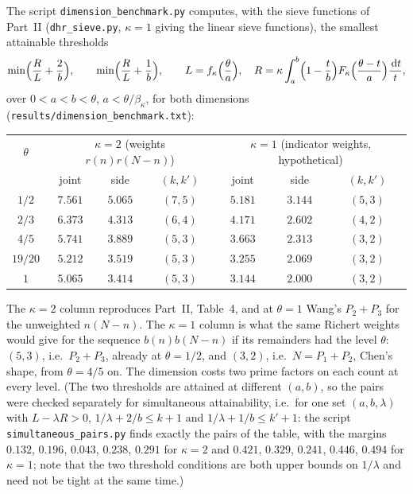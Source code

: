 \documentclass[11pt,a4paper]{article}
\theoremstyle{remark}
\theoremstyle{definition}
\newcommand{\dd}{\,\mathrm d}
\begin{document}
The script \texttt{dimension\_benchmark.py} computes, with the sieve functions of Part~II (\texttt{dhr\_sieve.py}, $\kappa=1$ giving the linear sieve functions), the smallest attainable thresholds
\[
\min\Bigl(\frac RL+\frac2b\Bigr),\qquad\min\Bigl(\frac RL+\frac1b\Bigr),\qquad L=f_\kappa\Bigl(\frac\theta a\Bigr),\quad R=\kappa\int_a^b\Bigl(1-\frac tb\Bigr)F_\kappa\Bigl(\frac{\theta-t}a\Bigr)\frac{\dd t}t,
\]
over $0<a<b<\theta$, $a<\theta/\beta_\kappa$, for both dimensions (\texttt{results/dimension\_benchmark.txt}):

\begin{center}\small
\begin{tabular}{c|ccc|ccc}
\toprule
$\theta$ & \multicolumn{3}{c|}{$\kappa=2$ (weights $r(n)r(N-n)$)} & \multicolumn{3}{c}{$\kappa=1$ (indicator weights, hypothetical)}\\
 & joint & side & $(k,k')$ & joint & side & $(k,k')$\\
\midrule
$1/2$ & $7.561$ & $5.065$ & $(7,5)$ & $5.181$ & $3.144$ & $(5,3)$\\
$2/3$ & $6.373$ & $4.313$ & $(6,4)$ & $4.171$ & $2.602$ & $(4,2)$\\
$4/5$ & $5.741$ & $3.889$ & $(5,3)$ & $3.663$ & $2.313$ & $(3,2)$\\
$19/20$ & $5.212$ & $3.519$ & $(5,3)$ & $3.255$ & $2.069$ & $(3,2)$\\
$1$ & $5.065$ & $3.414$ & $(5,3)$ & $3.144$ & $2.000$ & $(3,2)$\\
\bottomrule
\end{tabular}
\end{center}

The $\kappa=2$ column reproduces Part~II, Table~4, and at $\theta=1$ Wang's $P_2+P_3$ for the unweighted $n(N-n)$. The $\kappa=1$ column is what the same Richert weights would give for the sequence $b(n)b(N-n)$ if its remainders had the level $\theta$: $(5,3)$, i.e.\ $P_2+P_3$, already at $\theta=1/2$, and $(3,2)$, i.e.\ $N=P_1+P_2$, Chen's shape, from $\theta=4/5$ on. The dimension costs two prime factors on each count at every level. (The two thresholds are attained at different $(a,b)$, so the pairs were checked separately for simultaneous attainability, i.e.\ for one set $(a,b,\lambda)$ with $L-\lambda R>0$, $1/\lambda+2/b\le k+1$ and $1/\lambda+1/b\le k'+1$: the script \texttt{simultaneous\_pairs.py} finds exactly the pairs of the table, with the margins $0.132$, $0.196$, $0.043$, $0.238$, $0.291$ for $\kappa=2$ and $0.421$, $0.329$, $0.241$, $0.446$, $0.494$ for $\kappa=1$; note that the two threshold conditions are both upper bounds on $1/\lambda$ and need not be tight at the same time.)
\end{document}
